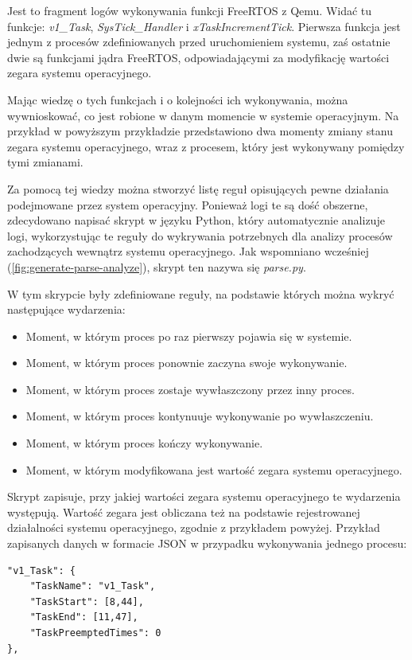 \documentclass[../../main]{subfiles}
\begin{document}
Jest to fragment logów wykonywania funkcji FreeRTOS z Qemu. Widać tu funkcje: \textit{v1\_Task}, \textit{SysTick\_Handler} i \textit{xTaskIncrementTick}. Pierwsza funkcja jest jednym z procesów zdefiniowanych przed uruchomieniem systemu, zaś ostatnie dwie są funkcjami jądra FreeRTOS, odpowiadającymi za modyfikację wartości zegara systemu operacyjnego.

Mając wiedzę o tych funkcjach i o kolejności ich wykonywania, można wywnioskować, co jest robione w danym momencie w systemie operacyjnym. Na przykład w powyższym przykładzie przedstawiono dwa momenty zmiany stanu zegara systemu operacyjnego, wraz z procesem, który jest wykonywany pomiędzy tymi zmianami.

Za pomocą tej wiedzy można stworzyć listę reguł opisujących pewne działania podejmowane przez system operacyjny. Ponieważ logi te są dość obszerne, zdecydowano napisać skrypt w języku Python, który automatycznie analizuje logi, wykorzystując te reguły do wykrywania potrzebnych dla analizy procesów zachodzących wewnątrz systemu operacyjnego. Jak wspomniano wcześniej (\cref{fig:generate-parse-analyze}), skrypt ten nazywa się \textit{parse.py}.

W tym skrypcie były zdefiniowane reguły, na podstawie których można wykryć następujące wydarzenia:

\begin{itemize}
    \item Moment, w którym proces po raz pierwszy pojawia się w systemie.
    \item Moment, w którym proces ponownie zaczyna swoje wykonywanie.
    \item Moment, w którym proces zostaje wywłaszczony przez inny proces.
    \item Moment, w którym proces kontynuuje wykonywanie po wywłaszczeniu.
    \item Moment, w którym proces kończy wykonywanie.
    \item Moment, w którym modyfikowana jest wartość zegara systemu operacyjnego.
\end{itemize}

Skrypt zapisuje, przy jakiej wartości zegara systemu operacyjnego te wydarzenia występują. Wartość zegara jest obliczana też na podstawie rejestrowanej działalności systemu operacyjnego, zgodnie z przykładem powyżej. Przykład zapisanych danych w formacie JSON w przypadku wykonywania jednego procesu:

\begin{lstlisting}[caption={Przykładowe pomiary dla jednego procesu}, label={lst:example-process-measurements}]
"v1_Task": {
    "TaskName": "v1_Task",
    "TaskStart": [8,44],
    "TaskEnd": [11,47],
    "TaskPreemptedTimes": 0
},
\end{lstlisting}
\end{document}
